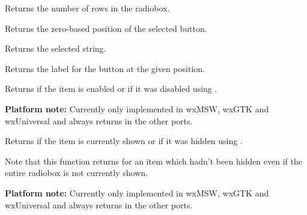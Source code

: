 \label{wxradioboxgetrowcount}


Returns the number of rows in the radiobox.


\label{wxradioboxgetselection}


Returns the zero-based position of the selected button.


\label{wxradioboxgetstringselection}


Returns the selected string.


\label{wxradioboxgetstring}


Returns the label for the button at the given position.




\label{wxradioboxisitemenabled}


Returns \true if the item is enabled or \false if it was disabled using
.

{\bf Platform note:} Currently only implemented in wxMSW, wxGTK and wxUniversal
and always returns \true in the other ports.


\label{wxradioboxisitemshown}


Returns \true if the item is currently shown or \false if it was hidden using
.

Note that this function returns \true for an item which hadn't been hidden even
if the entire radiobox is not currently shown.

{\bf Platform note:} Currently only implemented in wxMSW, wxGTK and wxUniversal
and always returns \true in the other ports.


\label{wxradioboxnumber}


